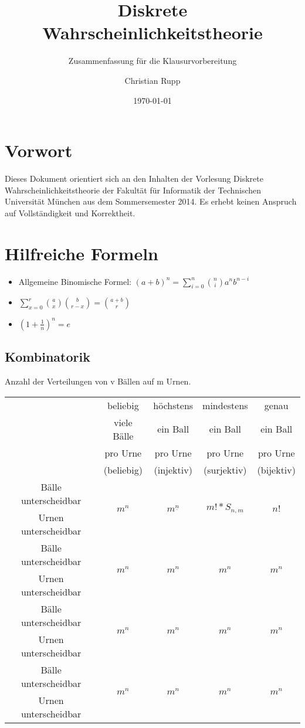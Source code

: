 \documentclass[a4,12pt]{scrartcl}
\title{Diskrete Wahrscheinlichkeitstheorie}
\subtitle{Zusammenfassung für die Klausurvorbereitung}
\author{Christian Rupp}
\date{\today}
\begin{document}
\maketitle

\newpage

\tableofcontents

\section{Vorwort}

Dieses Dokument orientiert sich an den Inhalten der Vorlesung Diskrete Wahrscheinlichkeitstheorie der Fakultät für Informatik der Technischen Universität München aus dem Sommersemester 2014.
Es erhebt keinen Anspruch auf Vollständigkeit und Korrektheit.

\section{Hilfreiche Formeln}

\begin{itemize}
\item Allgemeine Binomische Formel: $(a+b)^n=\sum^n_{i=0}\binom {n}{i}a^nb^{n-i}$
\item $\sum^r_{x=0}\binom{a}{x}\binom{b}{r-x}=\binom{a+b}{r}$
\item $\left(1+\frac{1}{n}\right)^n=e$
\end{itemize}

\subsection{Kombinatorik}
Anzahl der Verteilungen von v Bällen auf m Urnen.\\
\begin{tabular}{|c||c|c|c|c|}
\hline
&beliebig &höchstens &mindestens&genau\\
&viele Bälle&ein Ball& ein Ball& ein Ball\\
& pro Urne& pro Urne& pro Urne& pro Urne\\
& (beliebig)& (injektiv) & (surjektiv)& (bijektiv)\\
\hline
\hline
Bälle unterscheidbar& \multirow{2}{*}{$m^n$} &\multirow{2}{*}{$m^\underline{n}$} &\multirow{2}{*}{$m!*S_{n,m}$} &\multirow{2}{*}{$n!$}\\
Urnen unterscheidbar &&&&\\
\hline
Bälle unterscheidbar& \multirow{2}{*}{$m^n$} &\multirow{2}{*}{$m^n$} &\multirow{2}{*}{$m^n$} &\multirow{2}{*}{$m^n$}\\
Urnen unterscheidbar &&&&\\
\hline
Bälle unterscheidbar& \multirow{2}{*}{$m^n$} &\multirow{2}{*}{$m^n$} &\multirow{2}{*}{$m^n$} &\multirow{2}{*}{$m^n$}\\
Urnen unterscheidbar &&&&\\
\hline
Bälle unterscheidbar& \multirow{2}{*}{$m^n$} &\multirow{2}{*}{$m^n$} &\multirow{2}{*}{$m^n$} &\multirow{2}{*}{$m^n$}\\
Urnen unterscheidbar &&&&\\
\hline
\end{tabular}
\end{document}
